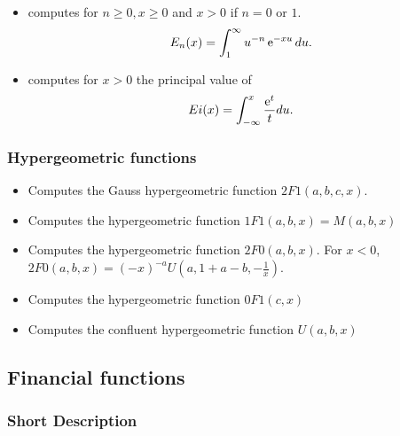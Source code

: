 \begin{itemize}
\item {}
  \sshortdescribe   computes for  $ n\geq 0, x \geq 0$ and $x>0$ if $n=0$ or $1$.
  \begin{equation*}
    E_n(x)= \int_1^{\infty} u^{-n} \operatorname{e}^{ -x u } du.
  \end{equation*}
\item {}
  \sshortdescribe   computes for  $x>0$  the principal value of
  \begin{equation*}
    Ei(x)= \int_{-\infty}^x \frac{\operatorname{e}^{ t }}{t}  du.
  \end{equation*}
\end{itemize}

\subsubsection{Hypergeometric functions}

\begin{itemize}
\item {}
\sshortdescribe Computes the Gauss hypergeometric function $2F1(a,b,c,x)$. 
\item {}
  \sshortdescribe Computes the hypergeometric function $1F1(a,b,x) = M(a,b,x)$
\item {}
  \sshortdescribe Computes the hypergeometric function $2F0(a,b,x)$. For
  $x<0$, $2F0 (a,b,x) = (-x)^{-a} U(a,1+a-b,-\frac{1}{x})$.
\item {}
  \sshortdescribe Computes the hypergeometric function $0F1(c,x)$
\item {}
    \sshortdescribe Computes the confluent hypergeometric function $U(a,b,x)$
\end{itemize}


\subsection{Financial functions}
\subsubsection{Short Description}

